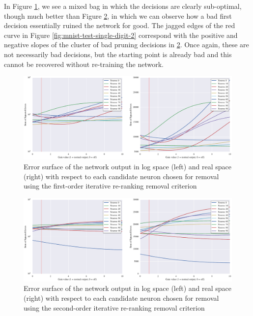 In Figure \ref{fig:mnist-test-single-digit-2-g1}, we see a mixed bag in which the decisions are clearly sub-optimal, though much better than Figure \ref{fig:mnist-test-single-digit-2-g2}, in which we can observe how a bad first decision essentially ruined the network for good. The jagged edges of the red curve in Figure \ref{fig:mnist-test-single-digit-2} correspond with the positive and negative slopes of the cluster of bad pruning decisions in \ref{fig:mnist-test-single-digit-2-g2}. Once again, these are not necessarily bad decisions, but the starting point is already bad and this cannot be recovered without re-training the network. 

\begin{figure}[!ht]
\centering
\includegraphics[width=\linewidth]{mnist-test-single-digit-2-g1.pdf}
\caption{Error surface of the network output in log space (left) and real space (right) with respect to each candidate neuron chosen for removal using the first-order iterative re-ranking removal criterion}
\label{fig:mnist-test-single-digit-2-g1}
\end{figure}

\begin{figure}[!ht]
\centering
\includegraphics[width=\linewidth]{mnist-test-single-digit-2-g2.pdf}
\caption{Error surface of the network output in log space (left) and real space (right) with respect to each candidate neuron chosen for removal using the second-order iterative re-ranking removal criterion}
\label{fig:mnist-test-single-digit-2-g2}
\end{figure}

